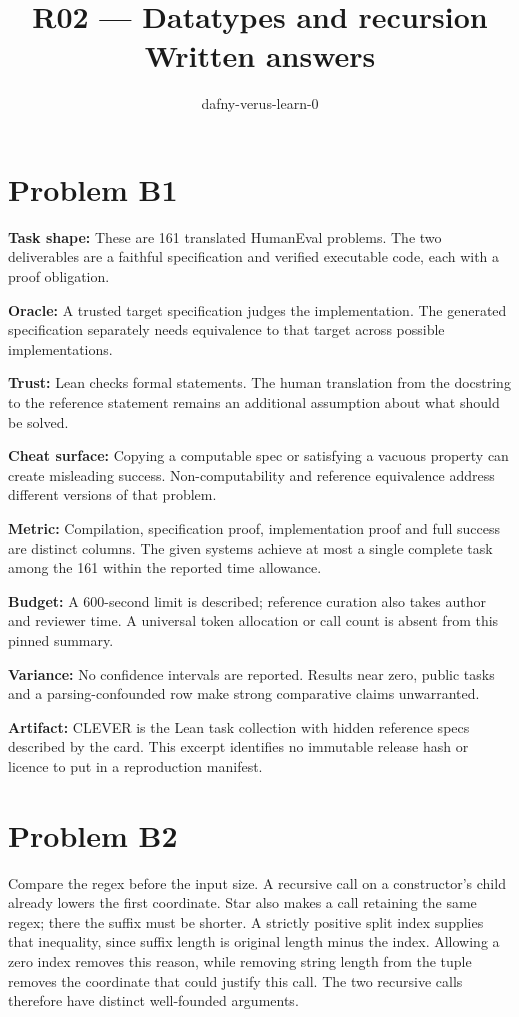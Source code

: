 \documentclass[11pt]{article}
\title{R02 --- Datatypes and recursion \\ \large Written answers}
\author{dafny-verus-learn-0}
\date{}
\begin{document}
\maketitle
\section*{Problem B1}\label{ans:B1}
\begin{answer}
\textbf{Task shape:} These are 161 translated HumanEval problems. The two deliverables are a faithful specification and verified executable code, each with a proof obligation.

\textbf{Oracle:} A trusted target specification judges the implementation. The generated specification separately needs equivalence to that target across possible implementations.

\textbf{Trust:} Lean checks formal statements. The human translation from the docstring to the reference statement remains an additional assumption about what should be solved.

\textbf{Cheat surface:} Copying a computable spec or satisfying a vacuous property can create misleading success. Non-computability and reference equivalence address different versions of that problem.

\textbf{Metric:} Compilation, specification proof, implementation proof and full success are distinct columns. The given systems achieve at most a single complete task among the 161 within the reported time allowance.

\textbf{Budget:} A 600-second limit is described; reference curation also takes author and reviewer time. A universal token allocation or call count is absent from this pinned summary.

\textbf{Variance:} No confidence intervals are reported. Results near zero, public tasks and a parsing-confounded row make strong comparative claims unwarranted.

\textbf{Artifact:} CLEVER is the Lean task collection with hidden reference specs described by the card. This excerpt identifies no immutable release hash or licence to put in a reproduction manifest.
\end{answer}
\section*{Problem B2}\label{ans:B2}
\begin{answer}
Compare the regex before the input size. A recursive call on a constructor's
child already lowers the first coordinate. Star also makes a call retaining
the same regex; there the suffix must be shorter. A strictly positive split
index supplies that inequality, since suffix length is original length minus
the index. Allowing a zero index removes this reason, while removing string
length from the tuple removes the coordinate that could justify this call.
The two recursive calls therefore have distinct well-founded arguments.
\end{answer}
\end{document}
